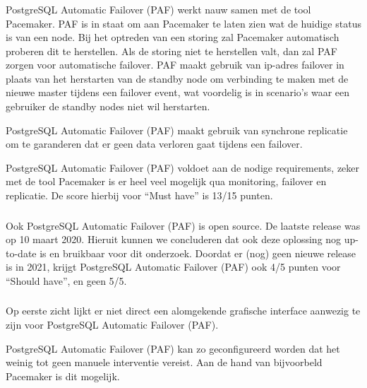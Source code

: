 \subsubsection{}
\label{subsubsec:Must have}

PostgreSQL Automatic Failover (PAF) werkt nauw samen met de tool Pacemaker. PAF is in staat om aan Pacemaker te laten zien wat de huidige status is van een node. Bij het optreden van een storing zal Pacemaker automatisch proberen dit te herstellen.
Als de storing niet te herstellen valt, dan zal PAF zorgen voor automatische failover. PAF maakt gebruik van ip-adres failover in plaats van het herstarten van de standby node om verbinding te maken met de nieuwe master tijdens een failover event, wat voordelig is in scenario's waar een gebruiker de standby nodes niet wil herstarten.

PostgreSQL Automatic Failover (PAF) maakt gebruik van synchrone replicatie om te garanderen dat er geen data verloren gaat tijdens een failover.

PostgreSQL Automatic Failover (PAF) voldoet aan de nodige requirements, zeker met de tool Pacemaker is er heel veel mogelijk qua monitoring, failover en replicatie. De score hierbij voor “Must have” is 13/15 punten.

\subsubsection{}
\label{subsubsec:Should have}

Ook PostgreSQL Automatic Failover (PAF) is open source.
De laatste release was op 10 maart 2020. Hieruit kunnen we concluderen dat ook deze oplossing nog up-to-date is en bruikbaar voor dit onderzoek. 
Doordat er (nog) geen nieuwe release is in 2021, krijgt PostgreSQL Automatic Failover (PAF) ook 4/5 punten voor “Should have”, en geen 5/5.

\subsubsection{}
\label{subsubsec:Could have}

Op eerste zicht lijkt er niet direct een alomgekende grafische interface aanwezig te zijn voor PostgreSQL Automatic Failover (PAF).

PostgreSQL Automatic Failover (PAF) kan zo geconfigureerd worden dat het weinig tot geen manuele interventie vereist. Aan de hand van bijvoorbeld Pacemaker is dit mogelijk.



